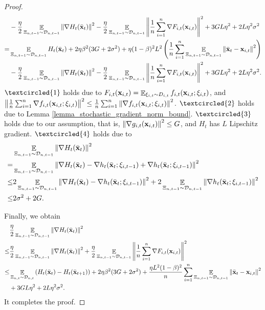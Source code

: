 \documentclass{article}
\begin{document}
\begin{proof}
\begin{align}
& - \frac{\eta}{2}\mathop{\mathbb{E}}_{ \Xi_{n,t-1} \sim \mathcal{D}_{n,t-1} }\left\lVert\nabla H_t(\bar{{\bf x}}_t)\right\rVert^2 - \frac{\eta}{2}\mathop{\mathbb{E}}_{ \Xi_{n,t-1} \sim \mathcal{D}_{n,t-1} }\left\lVert\frac{1}{n}\sum_{i=1}^n \nabla F_{i,t}({\bf x}_{i,t})\right\rVert^2  + 3GL\eta^2  + 2L\eta^2 \sigma^2  \\ \nonumber
= & \mathop{\mathbb{E}}_{ \Xi_{n,t-1} \sim \mathcal{D}_{n,t-1} }H_t(\bar{{\bf x}}_t) + 2\eta\beta^2 (3G + 2\sigma^2) + \eta(1-\beta)^2 L^2\left( \frac{1}{n}\sum_{i=1}^n \mathop{\mathbb{E}}_{ \Xi_{n,t-1} \sim \mathcal{D}_{n,t-1} }\left\lVert\bar{{\bf x}}_t -{\bf x}_{i,t}\right\rVert^2 \right) \\ \nonumber 
& - \frac{\eta}{2}\mathop{\mathbb{E}}_{ \Xi_{n,t-1} \sim \mathcal{D}_{n,t-1} }\left\lVert\nabla H_t(\bar{{\bf x}}_t)\right\rVert^2 - \frac{\eta}{2}\mathop{\mathbb{E}}_{ \Xi_{n,t-1} \sim \mathcal{D}_{n,t-1} }\left\lVert\frac{1}{n}\sum_{i=1}^n \nabla F_{i,t}({\bf x}_{i,t})\right\rVert^2  +  3GL\eta^2  + 2L\eta^2 \sigma^2.
\end{align} $\textcircled{1}$ holds due to $F_{i,t}({\bf x}_{i,t}) = \mathop{\mathbb{E}}_{\xi_{i,t} \sim D_{i,t}} f_{i,t}({\bf x}_{i,t}; \xi_{i,t})$, and $\left\lVert\frac{1}{n}\sum_{i=1}^n \nabla f_{i,t}({\bf x}_{i,t};\xi_{i,t})\right\rVert^2 \le \frac{1}{n}\sum_{i=1}^n\left\lVert\nabla f_{i,t}({\bf x}_{i,t};\xi_{i,t})\right\rVert^2$. $\textcircled{2}$ holds due to Lemma \ref{lemma_stochastic_gradient_norm_bound}. $\textcircled{3}$ holds due to our assumption, that is, $\left\lVert\nabla g_{i,t}({\bf x}_{i,t})\right\rVert^2\le G$, and $H_t$ has $L$ Lipschitz gradient. $\textcircled{4}$ holds due to 
\begin{align}
\nonumber
& \mathop{\mathbb{E}}_{ \Xi_{n,t-1} \sim \mathcal{D}_{n,t-1} }\left\lVert\nabla H_t(\bar{{\bf x}}_t) \right\rVert^2 \\ \nonumber 
= & \mathop{\mathbb{E}}_{ \Xi_{n,t-1} \sim \mathcal{D}_{n,t-1} } \left\lVert\nabla H_t(\bar{{\bf x}}_t) - \nabla h_t(\bar{{\bf x}}_t; \xi_{i,t-1}) + \nabla h_t(\bar{{\bf x}}_t; \xi_{i,t-1}) \right\rVert^2 \\ \nonumber
\le & 2\mathop{\mathbb{E}}_{ \Xi_{n,t-1} \sim \mathcal{D}_{n,t-1} } \left\lVert\nabla H_t(\bar{{\bf x}}_t) - \nabla h_t(\bar{{\bf x}}_t; \xi_{i,t-1}) \right\rVert^2 + 2\mathop{\mathbb{E}}_{ \Xi_{n,t-1} \sim \mathcal{D}_{n,t-1} } \left\lVert\nabla h_t(\bar{{\bf x}}_t; \xi_{i,t-1}) \right\rVert^2 \\ \nonumber
\le & 2\sigma^2 + 2G.
\end{align}




Finally, we obtain
\begin{align}
\nonumber
& \frac{\eta}{2}\mathop{\mathbb{E}}_{ \Xi_{n,t-1} \sim \mathcal{D}_{n,t-1} }\left\lVert\nabla H_t(\bar{{\bf x}}_t)\right\rVert^2  \\ \nonumber
\le & \frac{\eta}{2}\mathop{\mathbb{E}}_{ \Xi_{n,t-1} \sim \mathcal{D}_{n,t-1} }\left\lVert\nabla H_t(\bar{{\bf x}}_t)\right\rVert^2 + \frac{\eta}{2}\mathop{\mathbb{E}}_{ \Xi_{n,t-1} \sim \mathcal{D}_{n,t-1} }\left\lVert\frac{1}{n}\sum_{i=1}^n \nabla F_{i,t}({\bf x}_{i,t})\right\rVert^2 \\ \nonumber 
\le & \mathop{\mathbb{E}}_{ \Xi_{n,t} \sim \mathcal{D}_{n,t} } \left( H_t(\bar{{\bf x}}_t) - H_t(\bar{{\bf x}}_{t+1}) \right) + 2\eta\beta^2(3G + 2\sigma^2) +  \frac{\eta L^2(1-\beta)^2}{n}\sum_{i=1}^n\mathop{\mathbb{E}}_{ \Xi_{n,t-1} \sim \mathcal{D}_{n,t-1} }\left\lVert\bar{{\bf x}}_t - {\bf x}_{i,t} \right\rVert^2 \\ \nonumber 
& + 3GL\eta^2  + 2L\eta^2 \sigma^2.
\end{align} It completes the proof.
\end{proof}
\end{document}
